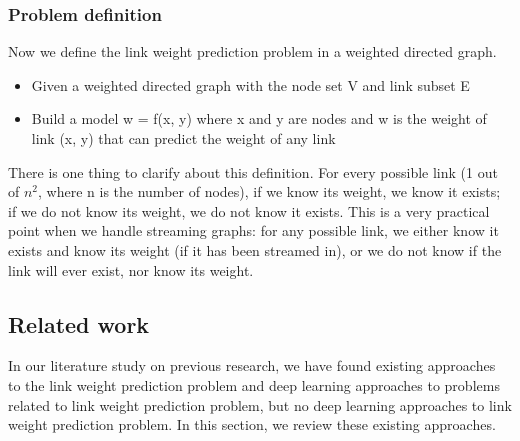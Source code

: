 \documentclass{article}
\begin{document}
\subsubsection{Problem definition}
Now we define the link weight prediction problem in a weighted directed graph.
\begin{itemize}
	\item Given a weighted directed graph with the node set V and link subset E
	\item Build a model w = f(x, y) where x and y are nodes and w is the weight of link (x, y) that can predict the weight of any link
\end{itemize}
There is one thing to clarify about this definition.
For every possible link (1 out of $ n^2 $, where n is the number of nodes), 
if we know its weight, we know it exists;
if we do not know its weight, we do not know it exists.
This is a very practical point when we handle streaming graphs:
for any possible link,
we either know it exists and know its weight (if it has been streamed in), or we do not know if the link will ever exist, nor know its weight.

\subsection{Related work}
In our literature study on previous research,
we have found existing approaches to the link weight prediction problem
and deep learning approaches to problems related to link weight prediction problem,
but no deep learning approaches to link weight prediction problem.
In this section, we review these existing approaches.
\end{document}
